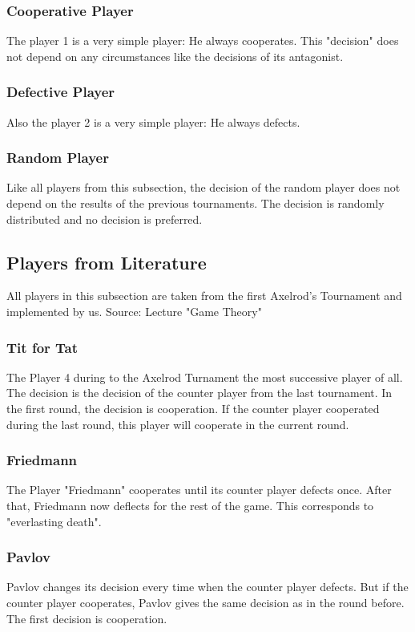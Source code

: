 \documentclass[11pt,twoside]{article}
\begin{document}
\subsubsection{Cooperative Player}
The player 1 is a very simple player: He always cooperates. This "decision" does not depend on any circumstances like the decisions of its antagonist. 

\subsubsection{Defective Player}
Also the player 2 is a very simple player: He always defects. 

\subsubsection{Random Player}
Like all players from this subsection, the decision of the random player does not depend on the results of the previous tournaments. The decision is randomly distributed and no decision is preferred.

\subsection{Players from Literature}

All players in this subsection are taken from the first Axelrod's Tournament and implemented by us. Source: Lecture "Game Theory" \cite{donninger}

\subsubsection{Tit for Tat}
The Player 4 during to the Axelrod Turnament the most successive player of all\cite{donninger}. The decision is the decision of the counter player from the last tournament. In the first round, the decision is cooperation. If the counter player cooperated during the last round, this player will cooperate in the current round.

\subsubsection{Friedmann}
The Player "Friedmann" cooperates until its counter player defects once. After that, Friedmann now deflects for the rest of the game. This corresponds to "everlasting death".

\subsubsection{Pavlov}
Pavlov changes its decision every time when the counter player defects. But if the counter player cooperates, Pavlov gives the same decision as in the round before. The first decision is cooperation. 
\end{document}
